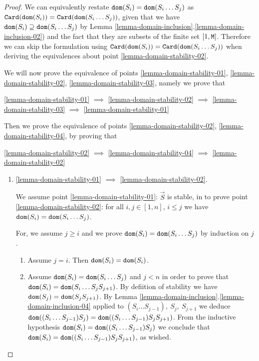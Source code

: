 \documentclass{lmcs}
\begin{document}
\begin{proof}

We can equivalently restate ${\tt dom}(S_i) =  {\tt dom}(S_i \ldots S_j)$ as
${\tt Card}({\tt dom}(S_i)) =  {\tt Card}({\tt dom}(S_i \ldots S_j))$, 
given that we have ${\tt dom}(S_i) \supseteq  {\tt dom}(S_i \ldots S_j)$ 
by Lemma \ref{lemma-domain-inclusion}.\ref{lemma-domain-inclusion-02})
and the fact that they are subsets of the finite set $[1,{\tt M}]$.
Therefore we can skip the formulation using 
${\tt Card}({\tt dom}(S_i)) =  {\tt Card}({\tt dom}(S_i \ldots S_j))$
when deriving the equivalences about point \ref{lemma-domain-stability-02}.

We will now prove the equivalence of points 
\ref{lemma-domain-stability-01},
\ref{lemma-domain-stability-02},
\ref{lemma-domain-stability-03},
namely we prove that
\begin{center}
\ref{lemma-domain-stability-01} 
$\implies$ 
\ref{lemma-domain-stability-02}
$\implies$ 
\ref{lemma-domain-stability-03} 
$\implies$ 
\ref{lemma-domain-stability-01}
\end{center}
Then we prove the equivalence of points
\ref{lemma-domain-stability-02},
\ref{lemma-domain-stability-04},
by proving that 
\begin{center}
\ref{lemma-domain-stability-02} $\implies$  
\ref{lemma-domain-stability-04} $\implies$  
\ref{lemma-domain-stability-02}
\end{center}


\begin{enumerate}

\item
\ref{lemma-domain-stability-01} $\implies$ \ref{lemma-domain-stability-02}.

We assume point \ref{lemma-domain-stability-01}: $\vec{S}$ is stable, in to prove 
point \ref{lemma-domain-stability-02}: 
for all $i, j \in [1, n]$, $i \le j$ we have ${\tt dom}(S_i) =  {\tt dom}(S_i \ldots S_j)$.

For, we assume $j \ge i$ and we prove ${\tt dom}(S_i) =  {\tt dom}(S_i \ldots S_j)$ by induction on $j$.
\begin{enumerate}
\item
Assume $j=i$. Then ${\tt dom}(S_i) =  {\tt dom}(S_i)$.
\item
Assume ${\tt dom}(S_i) =  {\tt dom}(S_i \ldots S_j)$ and $j<n$ in order to prove that 
${\tt dom}(S_i) =  {\tt dom}(S_i \ldots S_j S_{j+1})$. By defiition of stability we have 
${\tt dom}(S_j) = {\tt dom}(S_j S_{j+1})$. By Lemma 
\ref{lemma-domain-inclusion}.\ref{lemma-domain-inclusion-04} 
applied to $(S_i \ldots S_{j-1}), \ S_j, \ S_{j+1}$ we deduce 
${\tt dom}( (S_i \ldots S_{j-1}) S_j) = {\tt dom}( (S_i \ldots S_{j-1}) S_j S_{j+1})$.
From the inductive hypothesis ${\tt dom}(S_i) =  {\tt dom}( (S_i \ldots S_{j-1}) S_j)$
we conclude that ${\tt dom}(S_i) =  {\tt dom}((S_i \ldots S_{j-1}) S_j S_{j+1})$, as wished.
\end{enumerate}



\end{enumerate}
\end{proof}
\end{document}
